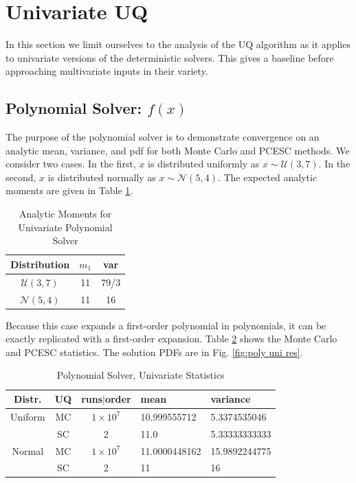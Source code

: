 \section{Univariate UQ}
In this section we limit ourselves to the analysis of the UQ algorithm as it applies to univariate versions of the deterministic solvers.  This gives a baseline before approaching multivariate inputs in their variety.

\subsection{Polynomial Solver: $f(x)$}
The purpose of the polynomial solver is to demonstrate convergence on an analytic mean, variance, and pdf for both Monte Carlo and PCESC methods.  We consider two cases.  In the first, $x$ is distributed uniformly as $x\sim\mathcal{U}(3,7)$.  In the second, $x$ is distributed normally as $x\sim\mathcal{N}(5,4)$.  The expected analytic moments are given in Table \ref{tab:poly uni mom}.
\begin{table}[H]
\centering
\begin{tabular}{c|c|c}
Distribution & $m_1$ & var \\ \hline
$\mathcal{U}(3,7)$ & 11 & 79/3\\
$\mathcal{N}(5,4)$ & 11 & 16
\end{tabular}
\caption{Analytic Moments for Univariate Polynomial Solver}
\label{tab:poly uni mom}
\end{table}
Because this case expands a first-order polynomial in polynomials, it can be exactly replicated with a first-order expansion.  Table \ref{tab:poly uni res} shows the Monte Carlo and PCESC statistics.  The solution PDFs are in Fig. \ref{fig:poly uni res}.

\begin{table}[H]
\begin{center}
\begin{tabular}{c|c c|l l}
Distr. & UQ & runs$|$order & mean & variance \\ \hline
Uniform & MC & $1\times10^7$ & 10.999555712 & 5.3374535046 \\
 & SC & 2 & 11.0 & 5.33333333333 \\ \hline
Normal & MC & $1\times10^7$ & 11.0000448162 & 15.9892244775 \\
 & SC & 2 & 11 & 16 
\end{tabular}
\end{center}
\caption{Polynomial Solver, Univariate Statistics}
\label{tab:poly uni res}
\end{table}

